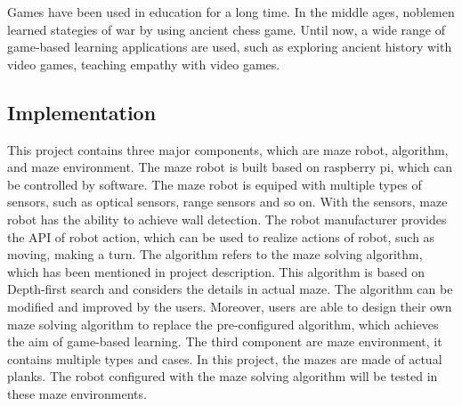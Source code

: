 \documentclass[11pt,times,oneside,openright,hardcopy]{eeereport}
\begin{document}
Games have been used in education for a long time. In the middle ages, noblemen learned stategies of war by using ancient chess game. Until now, a wide range of game-based learning applications are used, such as exploring ancient history with video games, teaching empathy with video games.


\subsection{Implementation}
This project contains three major components, which are maze robot, algorithm, and maze environment.
The maze robot is built based on raspberry pi, which can be controlled by software. The maze robot is equiped with multiple types of sensors, such as optical sensors, range sensors and so on. With the sensors, maze robot has the ability to achieve wall detection. The robot manufacturer provides the API of robot action, which can be used to realize actions of robot, such as moving, making a turn.
The algorithm refers to the maze solving algorithm, which has been mentioned in project description. This algorithm is based on Depth-first search and considers the details in actual maze. The algorithm can be modified and improved by the users. Moreover, users are able to design their own maze solving algorithm to replace the pre-configured algorithm, which achieves the aim of game-based learning.
The third component are maze environment, it contains multiple types and cases. In this project, the mazes are made of actual planks. The robot configured with the maze solving algorithm will be tested in these maze environments.
\end{document}
